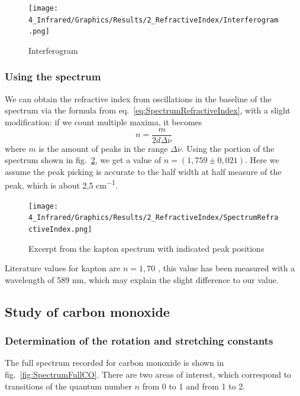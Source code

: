 \documentclass[12pt]{article}
\begin{document}
\begin{figure}[!ht]
    \centering
    \texttt{[image: 4\_Infrared/Graphics/Results/2\_RefractiveIndex/Interferogram.png]}
    \caption{Interferogram}
    \label{fig:Interferogram}
\end{figure}

\subsubsection{Using the spectrum}
We can obtain the refractive index from oscillations in the baseline of the spectrum via the formula from eq.~\ref{eq:SpectrumRefractiveIndex}, with a slight modification: if we count multiple maxima, it becomes
\begin{equation}
    n = \frac{m}{2d \Delta \overline{\nu}}
\end{equation}
where $m$ is the amount of peaks in the range $\Delta \overline{\nu}$. Using the portion of the spectrum shown in fig.~\ref{fig:SpectrumRefractiveIndex}, we get a value of $n =(1,759 \pm 0,021)$. Here we assume the peak picking is accurate to the half width at half measure of the peak, which is about 2,5 \si{cm^{-1}}.

\begin{figure}[!ht]
    \centering
    \texttt{[image: 4\_Infrared/Graphics/Results/2\_RefractiveIndex/SpectrumRefractiveIndex.png]}
    \caption{Excerpt from the kapton spectrum with indicated peak positions}
    \label{fig:SpectrumRefractiveIndex}
\end{figure}
\FloatBarrier

Literature values for kapton are $n=1,70$  \cite{DuPontKaptonRefractiveIndex}, this value has been measured with a wavelength of 589 \si{nm}, which may explain the slight difference to our value.

\subsection{Study of carbon monoxide}

\subsubsection{Determination of the rotation and stretching constants}

The full spectrum recorded for carbon monoxide is shown in fig.~\ref{fig:SpectrumFullCO}. There are two areas of interest, which correspond to transitions of the quantum number $n$ from 0 to 1 and from 1 to 2.
\end{document}
